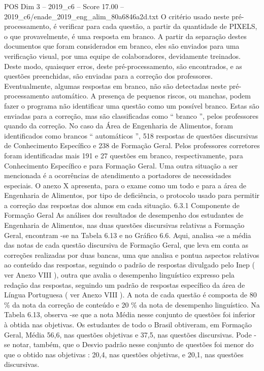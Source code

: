 \begin{textsample}{POS Dim 3 – 2019\_c6 – Score 17.00 – 2019\_c6/enade\_2019\_eng\_alim\_80a6846a2d.txt}
O critério usado neste pré-processamento, é verificar para cada questão, a partir da quantidade de PIXELS, o que provavelmente, é uma resposta em branco.
A partir da separação destes documentos que foram considerados em branco, eles são enviados para uma verificação visual, por uma equipe de colaboradores, devidamente treinados.
Deste modo, quaisquer erros, deste pré-processamento, são encontrados, e as questões preenchidas, são enviadas para a correção dos professores.
Eventualmente, algumas respostas em branco, não são detectadas neste pré-processamento automático.
A presença de pequenos riscos, ou manchas, podem fazer o programa não identificar uma questão como um possível branco.
Estas são enviadas para a correção, mas são classificadas como “ branco ”, pelos professores quando da correção.
No caso da Área de Engenharia de Alimentos, foram identificados como brancos “ automáticos ”, 518 respostas de questões discursivas de Conhecimento Específico e 238 de Formação Geral.
Pelos professores corretores foram identificadas mais 191 e 27 questões em branco, respectivamente, para Conhecimento Específico e para Formação Geral.
Uma outra situação a ser mencionada é a ocorrências de atendimento a portadores de necessidades especiais.
O anexo X apresenta, para o exame como um todo e para a área de Engenharia de Alimentos, por tipo de deficiência, o protocolo usado para permitir a correção das respostas dos alunos em cada situação. 6.3.1 Componente de Formação Geral As análises dos resultados de desempenho dos estudantes de Engenharia de Alimentos, nas duas questões discursivas relativas a Formação Geral, encontram -se na Tabela 6.13 e no Gráfico 6.6.
Aqui, analisa -se a média das notas de cada questão discursiva de Formação Geral, que leva em conta as correções realizadas por duas bancas, uma que analisa e pontua aspectos relativos ao conteúdo das respostas, seguindo o padrão de respostas divulgado pelo Inep ( ver Anexo VIII ), outra que avalia o desempenho linguístico expresso pela redação das respostas, seguindo um padrão de respostas específico da área de Língua Portuguesa ( ver Anexo VIII ).
A nota de cada questão é composta de 80 \% da nota da correção de conteúdo e 20 \% da nota de desempenho linguístico.
Na Tabela 6.13, observa -se que a nota Média nesse conjunto de questões foi inferior à obtida nas objetivas.
Os estudantes de todo o Brasil obtiveram, em Formação Geral, Média 56,6, nas questões objetivas e 37,5, nas questões discursivas.
Pode -se notar, também, que o Desvio padrão nesse conjunto de questões foi menor do que o obtido nas objetivas : 20,4, nas questões objetivas, e 20,1, nas questões discursivas.

\end{textsample}
